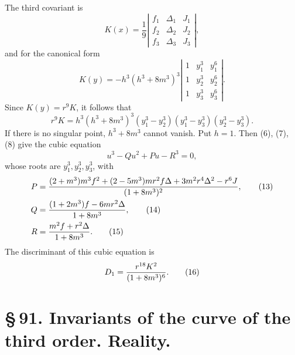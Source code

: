 \documentclass[11pt]{article}
\begin{document}
The third covariant is
\begin{equation}
 K(x)=\frac1{9}
 \left|\begin{array}{ccc}
 f_1&\Delta_1&J_1\\
 f_2&\Delta_2&J_2\\
 f_3&\Delta_3&J_3
 \end{array}\right|,
 \tag{9}
\end{equation}
and for the canonical form
\begin{equation}
 K(y)=-h^3(h^3+8m^3)^3
 \left|\begin{array}{ccc}
 1&y_1^3&y_1^6\\
 1&y_2^3&y_2^6\\
 1&y_3^3&y_3^6
 \end{array}\right|.
 \tag{10}
\end{equation}
Since $K(y)=r^9K$, it follows that
\begin{equation}
 r^9K=h^3(h^3+8m^3)^3(y_1^3-y_2^3)(y_1^3-y_3^3)(y_2^3-y_3^3).
 \tag{11}
\end{equation}
If there is no singular point, $h^3+8m^3$ cannot vanish. Put $h=1$. Then (6), (7), (8) give the cubic equation
\begin{equation}
 u^3-Qu^2+Pu-R^3=0,
 \tag{12}
\end{equation}
whose roots are $y_1^3,y_2^3,y_3^3$, with
\begin{align}
 P&={ (2+m^3)m^3f^2+(2-5m^3)mr^2f\Delta+3m^2r^4\Delta^2-r^6J\over (1+8m^3)^2},
 \tag{13}\\
 Q&={ (1+2m^3)f-6mr^2\Delta\over 1+8m^3},
 \tag{14}\\
 R&={m^2f+r^2\Delta\over 1+8m^3}.
 \tag{15}
\end{align}
The discriminant of this cubic equation is
\begin{equation}
 D_1={r^{18}K^2\over(1+8m^3)^6}.
 \tag{16}
\end{equation}

\section*{\S\,91. Invariants of the curve of the third order. Reality.}
\end{document}
